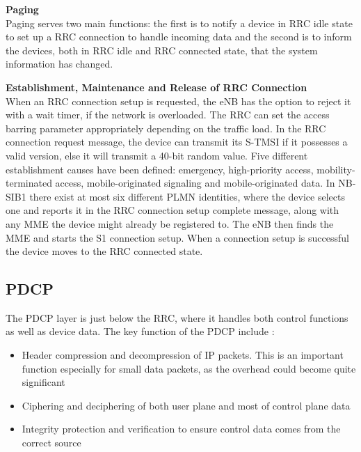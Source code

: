 \textbf{Paging} \\
Paging serves two main functions: the first is to notify a device in \gls{RRC} idle state to set up a \gls{RRC} connection to handle incoming data and the second is to inform the devices, both in \gls{RRC} idle and \gls{RRC} connected state, that the system information has changed. \citep[ch. 7]{NB-IoT_Book}

\textbf{Establishment, Maintenance and Release of \gls{RRC} Connection} \\
When an \gls{RRC} connection setup is requested, the \gls{eNB} has the option to reject it with a wait timer, if the network is overloaded. The \gls{RRC} can set the access barring parameter appropriately depending on the traffic load. In the \gls{RRC} connection request message, the device can transmit its \gls{S-TMSI} if it possesses a valid version, else it will transmit a 40-bit random value. Five different establishment causes have been defined: emergency, high-priority access, mobility-terminated access, mobile-originated signaling and mobile-originated data. In \gls{NB-SIB}1 there exist at most six different \gls{PLMN} identities, where the device selects one and reports it in the  \gls{RRC} connection setup complete message, along with any \gls{MME} the device might already be registered to. The \gls{eNB} then finds the \gls{MME} and starts the S1 connection setup. When a connection setup is successful the device moves to the \gls{RRC} connected state. \citep[ch. 6.6]{book_LTE_for_UMTS}





\subsection{PDCP}
The \gls{PDCP} layer is just below the \gls{RRC}, where it handles both control functions as well as device data. The key function of the \gls{PDCP} include \citep[ch. 6.5]{book_LTE_for_UMTS}:
\begin{itemize}
    \item Header compression and decompression of \gls{IP} packets. This is an important function especially for small data packets, as the overhead could become quite significant
    \item Ciphering and deciphering of both user plane and most of control plane data
    \item Integrity protection and verification to ensure control data comes from the correct source
\end{itemize}

